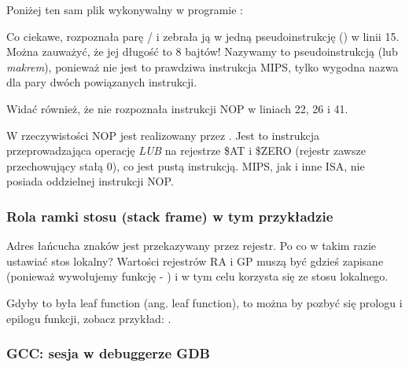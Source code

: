 Poniżej ten sam plik wykonywalny w programie \IDA:



Co ciekawe, \IDA rozpoznała parę / i zebrała ją w jedną pseudoinstrukcję
 () w linii 15.
Można zauważyć, że jej długość to 8 bajtów!
Nazywamy to pseudoinstrukcją (lub \emph{makrem}), ponieważ nie jest to prawdziwa instrukcja MIPS, tylko wygodna nazwa dla pary dwóch powiązanych instrukcji.

Widać również, że \IDA nie rozpoznała instrukcji \ac{NOP} w liniach 22, 26 i 41.

W rzeczywistości \ac{NOP} jest realizowany przez .
Jest to instrukcja  przeprowadzająca operację \emph{LUB} na rejestrze \$AT i \$ZERO (rejestr zawsze przechowujący stałą 0),
co jest pustą instrukcją.
MIPS, jak i inne \ac{ISA}, nie posiada oddzielnej instrukcji \ac{NOP}.

\subsubsection{Rola ramki stosu (stack frame) w tym przykładzie}

Adres łańcucha znaków jest przekazywany przez rejestr.
Po co w takim razie ustawiać stos lokalny?
Wartości rejestrów \ac{RA} i GP muszą być gdzieś zapisane
(ponieważ wywołujemy funkcję - \printf) i w tym celu korzysta się ze stosu lokalnego.

Gdyby to była \gls{leaf function} (ang. leaf function), to można by pozbyć się prologu i epilogu funkcji, zobacz przykład:
 .

\subsubsection{\Optimizing GCC: sesja w debuggerze GDB}




